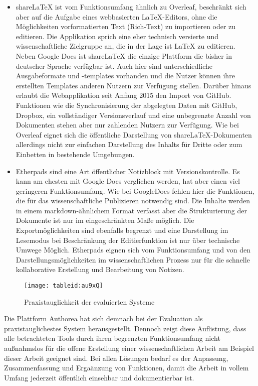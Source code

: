 \begin{itemize}
\item shareLaTeX ist vom Funktionsumfang ähnlich zu Overleaf, beschränkt sich aber auf die Aufgabe eines webbasierten LaTeX-Editors, ohne die Möglichkeiten vorformatierten Text (Rich-Text) zu importieren oder zu editieren. Die Applikation sprich eine eher technisch versierte und wissenschaftliche Zielgruppe an, die in der Lage ist LaTeX zu editieren. Neben Google Docs ist shareLaTeX die einzige Plattform die bisher in deutscher Sprache verfügbar ist. Auch hier sind unterschiedliche Ausgabeformate und -templates vorhanden und die Nutzer können ihre erstellten Templates anderen Nutzern zur Verfügung stellen. Darüber hinaus erlaubt die Webapplikation seit Anfang 2015 den Import von GitHub. Funktionen wie die Synchronisierung der abgelegten Daten mit GitHub, Dropbox, ein vollständiger Versionsverlauf und eine unbegrenzte Anzahl von Dokumenten stehen aber nur zahlenden Nutzern zur Verfügung. Wie bei Overleaf eignet sich die öffentliche Darstellung von shareLaTeX-Dokumenten allerdings nicht zur einfachen Darstellung des Inhalts für Dritte oder zum Einbetten in bestehende Umgebungen.
\item Etherpads sind eine Art öffentlicher Notizblock mit Versionskontrolle. Es kann am ehesten mit Google Docs verglichen werden, hat aber einen viel geringeren Funktionsumfang. Wie bei GoogleDocs fehlen hier die Funktionen, die für das wissenschaftliche Publizieren notwendig sind. Die Inhalte werden in einem markdown-ähnlichem Format verfasst aber die Strukturierung der Dokumente ist nur im eingeschränkten Maße möglich. Die Exportmöglichkeiten sind ebenfalls begrenzt und eine Darstellung im Lesemodus bei Beschränkung der Editierfunktion ist nur über technische Umwege Möglich. Etherpads eignen sich vom Funktionsumfang und von den Darstellungsmöglichkeiten im wissenschaftlichen Prozess nur für die schnelle kollaborative Erstellung und Bearbeitung von Notizen.
\end{itemize}

\begin{figure}[h!]
\texttt{[image: tableid:au9xQ]}
\caption{Praxistauglichkeit der evaluierten Systeme}
\end{figure}

Die Plattform Authorea hat sich demnach bei der Evaluation als praxistauglichestes System herausgestellt. Dennoch zeigt diese Auflistung, dass alle betrachteten Tools durch ihren begrenzten Funktionsumfang nicht außnahmslos für die offene Erstellung einer wissenschaftlichen Arbeit am Beispiel dieser Arbeit geeignet sind. Bei allen Lösungen bedarf es der Anpassung, Zusammenfassung und Ergaänzung von Funktionen, damit die Arbeit in vollem Umfang jederzeit öffentlich einsehbar und dokumentierbar ist.


